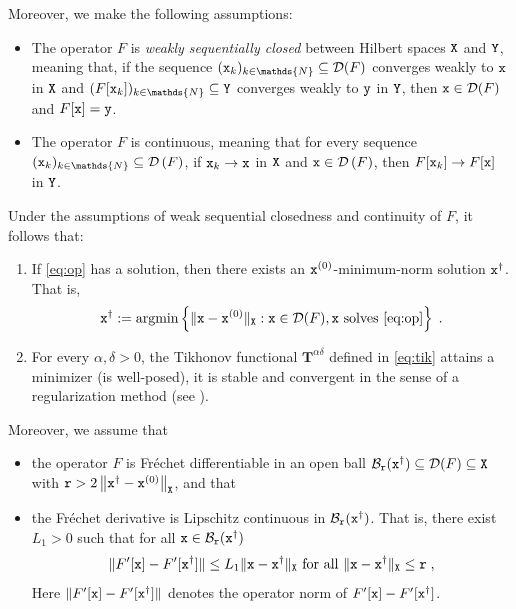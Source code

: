 \documentclass[10pt]{article}
\numberwithin{equation}{section}
\theoremstyle{nonumberplain}
\newcommand{\N}{\mathds{N}}
\newcommand{\dom}[1]{\mathcal{D}\left(#1\right)}
\newcommand{\norm}[1]{\left\|#1\right\|}
\newcommand{\norms}[1]{\|#1\|}
\newcommand{\set}[1]{\left\{#1\right\}}
\newcommand{\X}{{\tt X}}
\newcommand{\Y}{{\tt Y}}
\newcommand{\y}{{\tt y}}
\newcommand{\x}{{\tt x}}
\newcommand{\xdag}{\x^\dagger}
\newcommand{\Tik}{\mathbf{T}}
\begin{document}
Moreover, we make the following assumptions:
\begin{itemize} 
	\item The operator $F$ is \emph{weakly sequentially closed} between Hilbert spaces $\X$ and $\Y$, meaning that, if the sequence $(\x_k)_{k \in \N} \subseteq \mathcal{D}(F)$ converges weakly to $\x$ in $\X$ and $(F[\x_k])_{k \in \N} \subseteq \Y$ converges weakly to $\y$ in $\Y$, then $\x \in \mathcal{D}(F)$ and $F[\x]=\y$.
	\item The operator $F$ is continuous, meaning that for every sequence $(\x_k)_{k \in \N} \subseteq \dom{F}$, if $\x_k \to \x$ in $\X$ and $\x \in \dom{F}$, then $F[\x_k] \to F[\x]$ in $\Y$.
\end{itemize}
	Under the assumptions of weak sequential closedness and continuity of $F$, it follows that:
\begin{enumerate}
	\item If \autoref{eq:op} has a solution, then there exists an $\x^{(0)}$-minimum-norm solution $\xdag$. That is, 
	\begin{equation} \label{eq:argmin}
		\xdag := \text{argmin} \set{ \norms{\x-\x^{(0)}}_\X : \x \in \mathcal{D}(F), \x \text{ solves } \autoref{eq:op}}\;.
	\end{equation}
	\item For every $\alpha,\delta >0$, the Tikhonov functional $\Tik^{\alpha\delta}$ defined in \autoref{eq:tik} attains a minimizer (is well-posed), it is stable and convergent in the sense of a regularization method (see \cite[Theorem 10.2 \& Theorem 10.3]{EngHanNeu96}).
\end{enumerate}
Moreover, we assume that 
\begin{itemize}
	\item the operator $F$ is Fr\'echet differentiable in an open ball $\mathcal{B}_{\tt r}(\xdag) \subseteq \mathcal{D}(F) \subseteq \X$ with ${\tt r} > 2\norm{\xdag - \x^{(0)}}_\X$, and that
	\item the Fr\'echet derivative is Lipschitz continuous in $\mathcal{B}_{\tt r}(\xdag)$. That is, there exist $L_1 > 0$ such that for all $\x \in \mathcal{B}_{\tt r}(\xdag)$ 
	\begin{equation} \label{eq:lipschitz}
		\norms{F'[\x]-F'[\xdag]} \leq L_1 \norms{\x-\xdag}_\X  \text{ for all } \norms{\x - \xdag}_\X \leq {\tt r}\;,
	\end{equation}
	Here $\norms{F'[\x]-F'[\xdag]}$ denotes the operator norm of $F'[\x]-F'[\xdag]$.
	\end{itemize}
\end{document}
